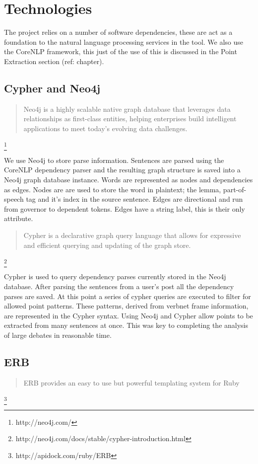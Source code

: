 \chapter{Technologies\label{chap:technologies}}
  The project relies on a number of software dependencies, these are act as a foundation to the natural language processing services in the tool. We also use the CoreNLP framework, this just of the use of this is discussed in the Point Extraction section (ref: chapter).

  \section{Cypher and Neo4j}
    \blockquote{Neo4j is a highly scalable native graph database that leverages data relationships as first-class entities, helping enterprises build intelligent applications to meet today's evolving data challenges.} \footnote{http://neo4j.com/}

    We use Neo4j to store parse information. Sentences are parsed using the CoreNLP dependency parser and the resulting graph structure is saved into a Neo4j graph database instance. Words are represented as nodes and dependencies as edges. Nodes are are used to store the word in plaintext; the lemma, part-of-speech tag and it's index in the source sentence. Edges are directional and run from governor to dependent tokens. Edges have a string label, this is their only attribute.

    \blockquote{Cypher is a declarative graph query language that allows for expressive and efficient querying and updating of the graph store.} \footnote{http://neo4j.com/docs/stable/cypher-introduction.html}

    Cypher is used to query dependency parses currently stored in the Neo4j database. After parsing the sentences from a user's post all the dependency parses are saved. At this point a series of cypher queries are executed to filter for allowed point patterns. These patterns, derived from verbnet frame information, are represented in the Cypher syntax. Using Neo4j and Cypher allow points to be extracted from many sentences at once. This was key to completing the analysis of large debates in reasonable time.

  \section{ERB}
    \blockquote{ERB provides an easy to use but powerful templating system for Ruby} \footnote{http://apidock.com/ruby/ERB}

